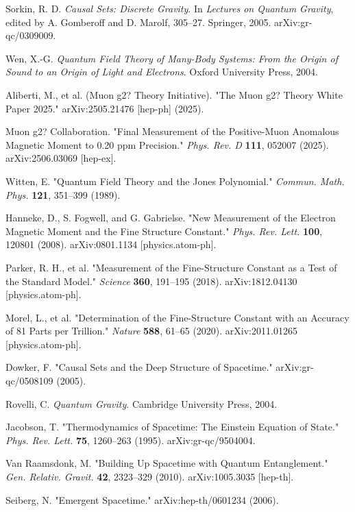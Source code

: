 \documentclass[11pt,a4paper]{article}
\theoremstyle{plain}
\theoremstyle{definition}
\begin{document}
\cite{Sorkin2005} Sorkin, R. D. \textit{Causal Sets: Discrete Gravity}. In \textit{Lectures on Quantum Gravity}, edited by A. Gomberoff and D. Marolf, 305–27. Springer, 2005. arXiv:gr-qc/0309009.

\cite{Wen2004} Wen, X.-G. \textit{Quantum Field Theory of Many-Body Systems: From the Origin of Sound to an Origin of Light and Electrons}. Oxford University Press, 2004.

\cite{Aliberti2025} Aliberti, M., et al. (Muon g2? Theory Initiative). "The Muon g2? Theory White Paper 2025." arXiv:2505.21476 [hep-ph] (2025).

\cite{MuonG22025} Muon g2? Collaboration. "Final Measurement of the Positive-Muon Anomalous Magnetic Moment to 0.20 ppm Precision." \textit{Phys. Rev. D} \textbf{111}, 052007 (2025). arXiv:2506.03069 [hep-ex].

\cite{Witten1989} Witten, E. "Quantum Field Theory and the Jones Polynomial." \textit{Commun. Math. Phys.} \textbf{121}, 351–399 (1989).

\cite{Hanneke2008} Hanneke, D., S. Fogwell, and G. Gabrielse. "New Measurement of the Electron Magnetic Moment and the Fine Structure Constant." \textit{Phys. Rev. Lett.} \textbf{100}, 120801 (2008). arXiv:0801.1134 [physics.atom-ph].

\cite{Parker2018} Parker, R. H., et al. "Measurement of the Fine-Structure Constant as a Test of the Standard Model." \textit{Science} \textbf{360}, 191–195 (2018). arXiv:1812.04130 [physics.atom-ph].

\cite{Morel2020} Morel, L., et al. "Determination of the Fine-Structure Constant with an Accuracy of 81 Parts per Trillion." \textit{Nature} \textbf{588}, 61–65 (2020). arXiv:2011.01265 [physics.atom-ph].

\cite{Dowker2005} Dowker, F. "Causal Sets and the Deep Structure of Spacetime." arXiv:gr-qc/0508109 (2005).

\cite{Rovelli2004} Rovelli, C. \textit{Quantum Gravity}. Cambridge University Press, 2004.

\cite{Jacobson1995} Jacobson, T. "Thermodynamics of Spacetime: The Einstein Equation of State." \textit{Phys. Rev. Lett.} \textbf{75}, 1260–263 (1995). arXiv:gr-qc/9504004.

\cite{VanRaamsdonk2010} Van Raamsdonk, M. "Building Up Spacetime with Quantum Entanglement." \textit{Gen. Relativ. Gravit.} \textbf{42}, 2323–329 (2010). arXiv:1005.3035 [hep-th].

\cite{Seiberg2006} Seiberg, N. "Emergent Spacetime." arXiv:hep-th/0601234 (2006).
\end{document}
